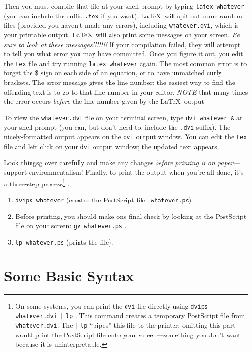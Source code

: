 \documentclass[preprint]{aastex}
\begin{document}
        Then you must compile that file at your shell prompt by typing
\verb&latex whatever& (you can include the suffix {\tt .tex} if you
want).  \LaTeX\ will spit out some random files (provided you haven't
made any errors), including \verb&whatever.dvi&, which is your printable
output.  \LaTeX\ will also print some messages on your screen.  {\it Be
sure to look at these messages!!!!!!!}  If your compilation failed, they
will attempt to tell you what error you may have committed.  Once you
figure it out, you edit the {\tt tex} file and try running {\tt latex
whatever} again.  The most common error is to forget the \$ sign on each
side of an equation, or to have unmatched curly brackets.  The error
message gives the line number; the easiest way to find the offending
text is to go to that line number in your editor. {\it NOTE} that many
times the error occurs {\it before} the line number given by the \LaTeX\
output.

        To view the \verb&whatever.dvi& file on your terminal screen,
type {\tt dvi whatever \&} at your shell prompt (you can, but don't need
to, include the {\tt .dvi} suffix). The nicely-formatted output appears
on the {\tt dvi} output window. You can edit the {\tt tex} file and left
click on your {\tt dvi} output window; the updated text appears.

Look thingsg over carefully and make any changes {\it before printing it
on paper}---support environmentalism!  Finally, to print the output when
you're all done, it's a three-step process\footnote{On some systems, you
can print the {\tt dvi} file directly using {\tt dvips whatever.dvi
$\vert$ lp} . This command creates a temporary PostScript file from {\tt
whatever.dvi}. The {\tt $\vert$ lp} ``pipes'' this file to the printer;
omitting this part would print the PostScript file onto your
screen---something you don't want because it is uninterpretable.}  :
\begin{enumerate}

\item \verb$dvips whatever$ (creates the PostScript file {\tt
  whatever.ps})

\item Before printing, you should make one final check by looking
at the PostScript file on your screen: {\tt gv whatever.ps} .

\item \verb$lp whatever.ps$ (prints the file).
\end{enumerate}

\section{Some Basic Syntax}\label{basicsec}
\end{document}
